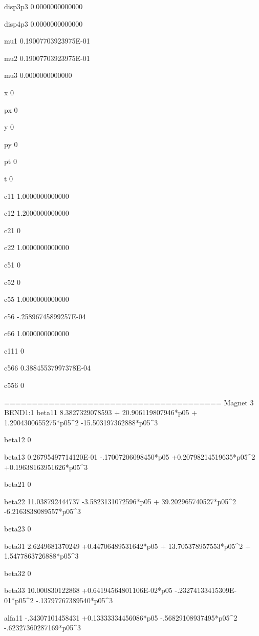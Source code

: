  disp3p3
   0.0000000000000 
  
 disp4p3
   0.0000000000000 
  
 mu1    
  0.19007703923975E-01 
  
 mu2    
  0.19007703923975E-01 
  
 mu3    
   0.0000000000000 
  
 x      
 0 
  
 px     
 0 
  
 y      
 0 
  
 py     
 0 
  
 pt     
 0 
  
 t      
 0 
  
 c11
   1.0000000000000 
  
 c12
   1.2000000000000 
  
 c21
 0 
  
 c22
   1.0000000000000 
  
 c51
 0 
  
 c52
 0 
  
 c55
   1.0000000000000 
  
 c56
  -.25896745899257E-04 
  
 c66
   1.0000000000000 
  
 c111
 0 
  
 c566
  0.38845537997378E-04 
  
 c556
 0 
  
 =======================================
 Magnet            3  BEND1:1         
 beta11 
   8.3827329078593 + 20.906119807946*p05 + 1.2904300655275*p05^2  -15.503197362888*p05^3 
  
 beta12 
 0 
  
 beta13 
  0.26795497714120E-01  -.17007206098450*p05 +0.20798214519635*p05^2 +0.19638163951626*p05^3 
  
 beta21 
 0 
  
 beta22 
   11.038792444737  -3.5823131072596*p05 + 39.202965740527*p05^2  -6.2163838089557*p05^3 
  
 beta23 
 0 
  
 beta31 
   2.6249681370249 +0.44706489531642*p05 + 13.705378957553*p05^2 + 1.5477863726888*p05^3 
  
 beta32 
 0 
  
 beta33 
   10.000830122868 +0.64194564801106E-02*p05  -.23274133415309E-01*p05^2  -.13797767389540*p05^3 
  
 alfa11 
  -.34307101458431 +0.13333334456086*p05  -.56829108937495*p05^2  -.62327360287169*p05^3 
  
